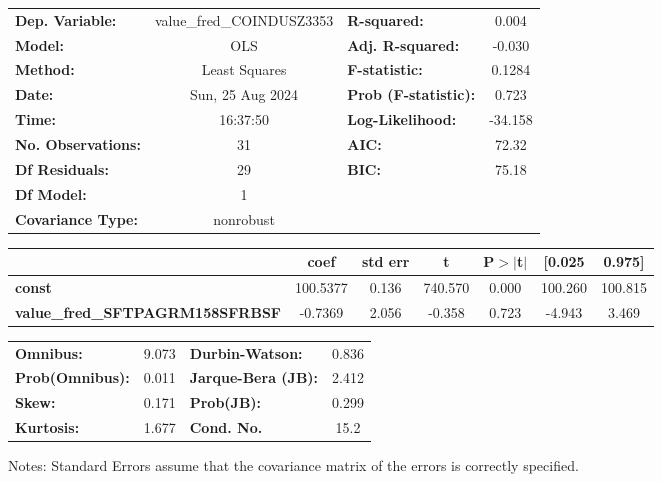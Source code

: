 \begin{center}
\begin{tabular}{lclc}
\toprule
\textbf{Dep. Variable:}                 & value\_fred\_COINDUSZ3353 & \textbf{  R-squared:         } &     0.004   \\
\textbf{Model:}                         &            OLS            & \textbf{  Adj. R-squared:    } &    -0.030   \\
\textbf{Method:}                        &       Least Squares       & \textbf{  F-statistic:       } &    0.1284   \\
\textbf{Date:}                          &      Sun, 25 Aug 2024     & \textbf{  Prob (F-statistic):} &    0.723    \\
\textbf{Time:}                          &          16:37:50         & \textbf{  Log-Likelihood:    } &   -34.158   \\
\textbf{No. Observations:}              &               31          & \textbf{  AIC:               } &     72.32   \\
\textbf{Df Residuals:}                  &               29          & \textbf{  BIC:               } &     75.18   \\
\textbf{Df Model:}                      &                1          & \textbf{                     } &             \\
\textbf{Covariance Type:}               &         nonrobust         & \textbf{                     } &             \\
\bottomrule
\end{tabular}
\begin{tabular}{lcccccc}
                                        & \textbf{coef} & \textbf{std err} & \textbf{t} & \textbf{P$> |$t$|$} & \textbf{[0.025} & \textbf{0.975]}  \\
\midrule
\textbf{const}                          &     100.5377  &        0.136     &   740.570  &         0.000        &      100.260    &      100.815     \\
\textbf{value\_fred\_SFTPAGRM158SFRBSF} &      -0.7369  &        2.056     &    -0.358  &         0.723        &       -4.943    &        3.469     \\
\bottomrule
\end{tabular}
\begin{tabular}{lclc}
\textbf{Omnibus:}       &  9.073 & \textbf{  Durbin-Watson:     } &    0.836  \\
\textbf{Prob(Omnibus):} &  0.011 & \textbf{  Jarque-Bera (JB):  } &    2.412  \\
\textbf{Skew:}          &  0.171 & \textbf{  Prob(JB):          } &    0.299  \\
\textbf{Kurtosis:}      &  1.677 & \textbf{  Cond. No.          } &     15.2  \\
\bottomrule
\end{tabular}
\end{center}

Notes: \newline
 [1] Standard Errors assume that the covariance matrix of the errors is correctly specified.